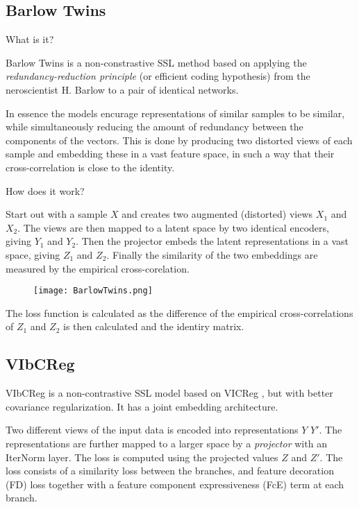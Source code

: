 \documentclass[../../thesis.tex]{subfiles}
\begin{document}



\subsection{Barlow Twins}
What is it?

Barlow Twins is a non-constrastive SSL method based on applying the \textit{redundancy-reduction principle} (or efficient coding hypothesis) \cite{Barlow_origin} from the neroscientist H. Barlow to a pair of identical networks. 

In essence the models encurage representations of similar samples to be similar, while simultaneously reducing the amount of redundancy between the components of the vectors. This is done by producing two distorted views of each sample and embedding these in a vast feature space, in such a way that their cross-correlation is close to the identity. 

How does it work?

Start out with a sample $X$ and creates two augmented (distorted) views $X_1$ and $X_2$. The views are then mapped to a latent space by two identical encoders, giving $Y_1$ and $Y_2$. Then the projector embeds the latent representations in a vast space, giving $Z_1$ and $Z_2$. Finally the similarity of the two embeddings are measured by the empirical cross-corelation.

\begin{figure}[h]
    \texttt{[image: BarlowTwins.png]}
    \centering    
    \caption{\cite{zbontar2021barlow}}
\end{figure}

The loss function is calculated as the difference of the empirical cross-correlations of $Z_1$ and $Z_2$ is then calculated and the identiry matrix. 


\subsection{VIbCReg}

VIbCReg \cite{lee2024vibcreg} is a non-contrastive SSL model based on VICReg \cite{bardes2022vicreg}, but with better covariance regularization.  It has a joint embedding architecture. 

Two different views of the input data is encoded into representations $Y$ $Y'$. The representations are further mapped to a larger space by a \textit{projector} with an IterNorm \cite{huang2019iterative} layer. The loss is computed using the projected values $Z$ and $Z'$. \newline
The loss consists of a similarity loss between the branches, and feature decoration (FD) loss together with a feature component expressiveness (FcE) term at each branch. 
\end{document}
